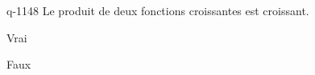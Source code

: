 \begin{truefalse}{q-1148}
Le produit de deux fonctions croissantes est croissant.
\item Vrai
\item* Faux
\end{truefalse}

